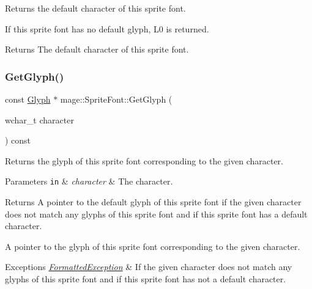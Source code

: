 Returns the default character of this sprite font.

If this sprite font has no default glyph, {\ttfamily L\textquotesingle{}0\textquotesingle{}} is returned.

\begin{DoxyReturn}{Returns}
The default character of this sprite font. 
\end{DoxyReturn}
\hypertarget{classmage_1_1_sprite_font_aa13424a1e0153ffb9433bb2cb416360b}{}\label{classmage_1_1_sprite_font_aa13424a1e0153ffb9433bb2cb416360b} 
\subsubsection{\texorpdfstring{Get\+Glyph()}{GetGlyph()}}
{\footnotesize\ttfamily const \hyperlink{structmage_1_1_glyph}{Glyph} $\ast$ mage\+::\+Sprite\+Font\+::\+Get\+Glyph (\begin{DoxyParamCaption}\item[{wchar\+\_\+t}]{character }\end{DoxyParamCaption}) const}

Returns the glyph of this sprite font corresponding to the given character.


\begin{DoxyParams}[1]{Parameters}
\mbox{\tt in}  & {\em character} & The character. \\
\hline
\end{DoxyParams}
\begin{DoxyReturn}{Returns}
A pointer to the default glyph of this sprite font if the given character does not match any glyphs of this sprite font and if this sprite font has a default character. 

A pointer to the glyph of this sprite font corresponding to the given character. 
\end{DoxyReturn}

\begin{DoxyExceptions}{Exceptions}
{\em \hyperlink{structmage_1_1_formatted_exception}{Formatted\+Exception}} & If the given character does not match any glyphs of this sprite font and if this sprite font has not a default character. \\
\hline
\end{DoxyExceptions}
\hypertarget{classmage_1_1_sprite_font_a281f33047c7627053a5bf61f8fa704fe}{}\label{classmage_1_1_sprite_font_a281f33047c7627053a5bf61f8fa704fe} 

